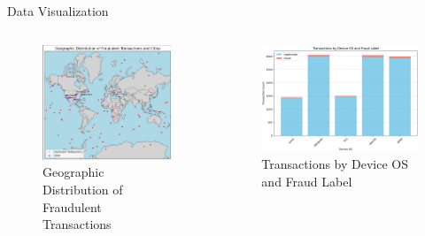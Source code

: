 \documentclass{beamer}
\begin{document}
\begin{frame}{Data Visualization}
    \begin{columns} %
        \begin{column}{0.5\textwidth}
            \begin{figure}
                \centering
                \includegraphics[width=1\textwidth]{images/mapa.png} %
                \caption{Geographic Distribution of Fraudulent Transactions}
            \end{figure}
        \end{column}
        
        \begin{column}{0.5\textwidth}
            \begin{figure}
                \centering
                \includegraphics[width=1\textwidth]{images/device.png} %
                \caption{Transactions by Device OS and Fraud Label }
            \end{figure}
        \end{column}
    \end{columns}
\end{frame}
\end{document}
